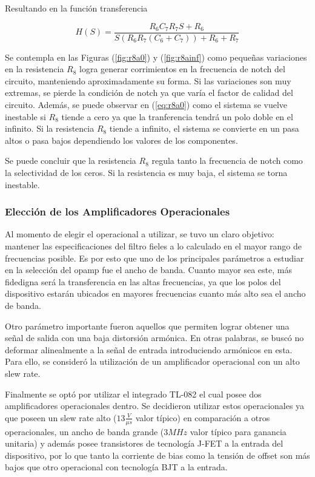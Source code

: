 Resultando en la función transferencia

\begin{equation}
H(S) = \frac{R_6 C_7 R_7 S + R_6 }{S (R_6 R_7 (C_6 + C_7)) + R_6 + R_7}
\end{equation}

Se contempla en las Figuras (\ref{fig:r8a0}) y (\ref{fig:r8ainf}) como pequeñas variaciones en la resistencia $R_8$ logra generar corrimientos en la frecuencia de notch del circuito, manteniendo aproximadamente su forma. Si las variaciones son muy extremas, se pierde la condición de notch ya que varía el factor de calidad del circuito. Además, se puede observar en (\ref{eq:r8a0}) como el sistema se vuelve inestable si $R_8$ tiende a cero ya que la tranferencia tendrá un polo doble en el infinito. Si la resistencia $R_8$ tiende a infinito, el sistema se convierte en un pasa altos o pasa bajos dependiendo los valores de los componentes.

Se puede concluir que la resistencia $R_8$ regula tanto la frecuencia de notch como la selectividad de los ceros. Si la resistencia es muy baja, el sistema se torna inestable.

\subsubsection{Elección de los Amplificadores Operacionales}

Al momento de elegir el operacional a utilizar, se tuvo un claro objetivo: mantener las especificaciones del filtro fieles a lo calculado en el mayor rango de frecuencias posible. Es por esto que uno de los principales parámetros a estudiar en la selección del opamp fue el ancho de banda. Cuanto mayor sea este, más fidedigna será la transferencia en las altas frecuencias, ya que los polos del dispositivo estarán ubicados en mayores frecuencias cuanto más alto sea el ancho de banda.

Otro parámetro importante fueron aquellos que permiten lograr obtener una señal de salida con una baja distorsión armónica. En otras palabras, se buscó no deformar alinealmente a la señal de entrada introduciendo armónicos en esta. Para ello, se consideró la utilización de un amplificador operacional con un alto slew rate.

Finalmente se optó por utilizar el integrado TL-082 el cual posee dos amplificadores operacionales dentro. Se decidieron utilizar estos operacionales ya que poseen un slew rate alto ($13\frac{V}{\mu s}$ valor típico) en comparación a otros operacionales, un ancho de banda grande ($3MHz$ valor típico para ganancia unitaria) y además posee transistores de tecnología J-FET a la entrada del dispositivo, por lo que tanto la corriente de bias como la tensión de offset son más bajos que otro operacional con tecnología BJT a la entrada.

